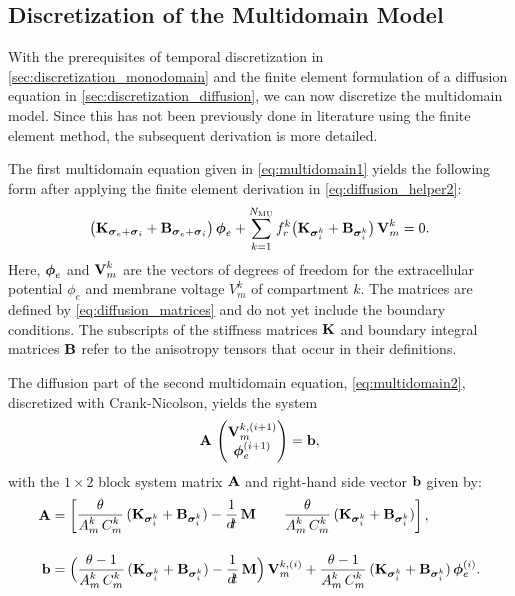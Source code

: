\subsection{Discretization of the Multidomain Model}\label{sec:discretization_multidomain}
With the prerequisites of temporal discretization in \cref{sec:discretization_monodomain} and the finite element formulation of a diffusion equation in \cref{sec:discretization_diffusion}, we can now discretize the multidomain model. Since this has not been previously done in literature using the finite element method, the subsequent derivation is more detailed.

The first multidomain equation given in \cref{eq:multidomain1} yields the following form after applying the finite element derivation in \cref{eq:diffusion_helper2}:
%
\begin{align}\label{eq:multidomain_discretization_helper_multidomain1}
  \big(\textbf{K}_{\boldsymbol{\sigma}_e + \boldsymbol{\sigma}_i} + \textbf{B}_{\boldsymbol{\sigma}_e + \boldsymbol{\sigma}_i}\big)\,\boldsymbol{\phi}_{e} +  \displaystyle\sum\limits_{k=1}^{N_\text{MU}} f_r^k \big(\textbf{K}_{\boldsymbol{\sigma}_i^k} + \textbf{B}_{\boldsymbol{\sigma}_i^k}\big)\,\textbf{V}_m^k = 0.  
\end{align}
Here, $\boldsymbol{\phi}_{e}$ and $\textbf{V}_m^k$ are the vectors of degrees of freedom for the extracellular potential $\phi_e$ and membrane voltage $V_m^k$ of compartment $k$. The matrices are defined by \cref{eq:diffusion_matrices} and do not yet include the boundary conditions.
The subscripts of the stiffness matrices $\textbf{K}$ and boundary integral matrices $\textbf{B}$ refer to the anisotropy tensors that occur in their definitions.

The diffusion part of the second multidomain equation, \cref{eq:multidomain2}, discretized with Crank-Nicolson, yields the system%
\begin{align}\label{eq:multidomain_discretization_helper_multidomain2}
  \textbf{A}\,\left(\begin{matrix}\textbf{V}_m^{k,(i+1)}\\ \boldsymbol{\phi}_{e}^{(i+1)}\end{matrix}\right) = \textbf{b},  
\end{align}
%
with the $1 \times 2$ block system matrix $\textbf{A}$ and right-hand side vector $\textbf{b}$ given by:%
\begin{subequations}\label{eq:multidomain_discretization_helper_multidomain3}
\begin{align}
   \bfA &= \matt{
      \dfrac{\theta}{A_m^k\,C_m^k}(\bfK_{\bfsigma_i^k} + \bfB_{\bfsigma_i^k}) -\dfrac{1}{\dt}\bfM & \quad
      \dfrac{\theta}{A_m^k\,C_m^k}(\bfK_{\bfsigma_i^k} + \bfB_{\bfsigma_i^k})
    }, \\[4mm]
    \bfb &= \Big( \dfrac{\theta-1}{A_m^k\,C_m^k}(\bfK_{\bfsigma_i^k} + \bfB_{\bfsigma_i^k}) - \dfrac{1}{\dt}\bfM\Big)\,\bfV_m^{k,(i)} 
      + \dfrac{\theta - 1}{A_m^k\,C_m^k}(\bfK_{\bfsigma_i^k} + \bfB_{\bfsigma_i^k})\,\bfphi_e^{(i)}.
\end{align}
\end{subequations}

